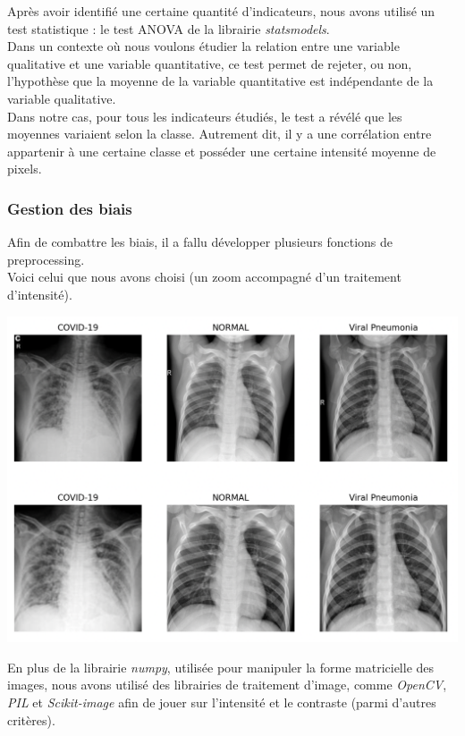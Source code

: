 \documentclass{article}
\begin{document}
	\par Après avoir identifié une certaine quantité d'indicateurs, nous avons utilisé un test statistique : le test ANOVA de la librairie \textit{statsmodels}.\\
	Dans un contexte où nous voulons étudier la relation entre une variable qualitative et une variable quantitative, ce test permet de rejeter, ou non, l'hypothèse que la moyenne de la variable quantitative est indépendante de la variable qualitative.\\
	Dans notre cas, pour tous les indicateurs étudiés, le test a révélé que les moyennes variaient selon la classe. Autrement dit, il y a une corrélation entre appartenir à une certaine classe et posséder une certaine intensité moyenne de pixels.
	
	\subsubsection*{Gestion des biais}
	
	\par Afin de combattre les biais, il a fallu développer plusieurs fonctions de preprocessing.\\
	Voici celui que nous avons choisi (un zoom accompagné d'un traitement d'intensité).
	\begin{center}
	\includegraphics[scale=0.4]{preprocess.png}
	\end{center}	
	
	\par En plus de la librairie \textit{numpy}, utilisée pour manipuler la forme matricielle des images, nous avons utilisé des librairies de traitement d'image, comme \textit{OpenCV}, \textit{PIL} et \textit{Scikit-image} afin de jouer sur l'intensité et le contraste (parmi d'autres critères).
	
\end{document}
